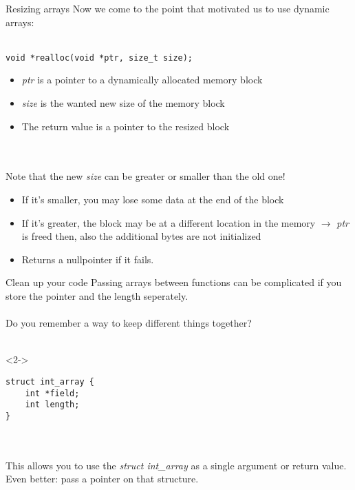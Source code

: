 
\begin{frame}[fragile]{Resizing arrays}
	Now we come to the point that motivated us to use dynamic arrays:\\
	\ \\
	\begin{lstlisting}[numbers=none]
void *realloc(void *ptr, size_t size);
\end{lstlisting}
	\begin{itemize}
		\item \textit{ptr} is a pointer to a dynamically allocated memory block
		\item \textit{size} is the wanted new size of the memory block
		\item The return value is a pointer to the resized block 
	\end{itemize} \ \\
	\ \\
	Note that the new \textit{size} can be greater or smaller than the old one!
	\begin{itemize}
		\item If it's smaller, you may lose some data at the end of the block
		\item If it's greater, the block may be at a different location in the memory $\rightarrow$ \textit{ptr} is freed then, also the additional bytes are not initialized
		\item Returns a nullpointer if it fails.
	\end{itemize}
\end{frame}


\begin{frame}[fragile]{Clean up your code}
	Passing arrays between functions can be complicated if you store the pointer and the length seperately.\\
	\ \\
	Do you remember a way to keep different things together?\\
	\ \\
	\begin{uncoverenv}<2->
		\begin{lstlisting}[numbers=none]
struct int_array {
	int *field;
	int length;
}
\end{lstlisting}\ \\
		\ \\
		This allows you to use the \textit{struct int\_array} as a single argument or return value. Even better: pass a pointer on that structure.
	\end{uncoverenv}
\end{frame}

